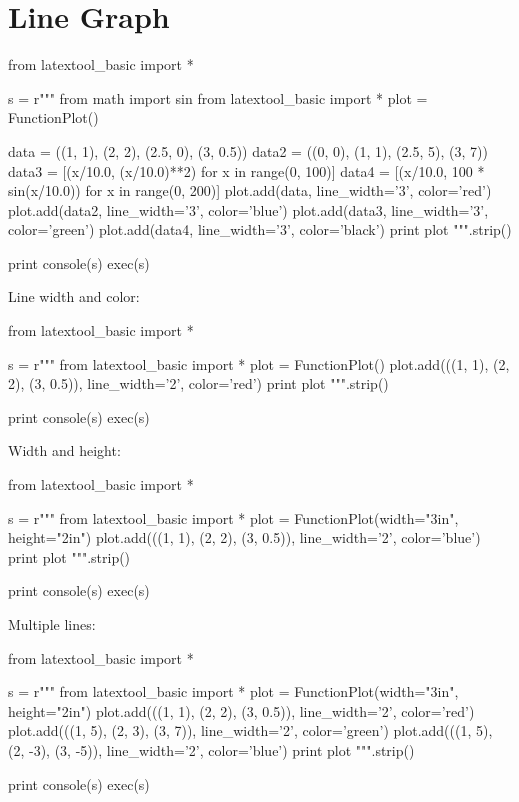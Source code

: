 \section{Line Graph}

\begin{python}
from latextool_basic import *

s = r"""
from math import sin
from latextool_basic import *
plot = FunctionPlot()

data = ((1, 1), (2, 2), (2.5, 0), (3, 0.5))
data2 = ((0, 0), (1, 1), (2.5, 5), (3, 7))
data3 = [(x/10.0, (x/10.0)**2) for x in range(0, 100)]
data4 = [(x/10.0, 100 * sin(x/10.0)) for x in range(0, 200)]
plot.add(data, line_width='3', color='red')
plot.add(data2, line_width='3', color='blue')
plot.add(data3, line_width='3', color='green')
plot.add(data4, line_width='3', color='black')
print plot
""".strip()

print console(s)
exec(s)
\end{python}





\newpage
Line width and color:
\begin{python}
from latextool_basic import *

s = r"""
from latextool_basic import *
plot = FunctionPlot()
plot.add(((1, 1), (2, 2), (3, 0.5)), line_width='2', color='red')
print plot
""".strip()

print console(s)
exec(s)
\end{python}



\newpage
Width and height:
\begin{python}
from latextool_basic import *

s = r"""
from latextool_basic import *
plot = FunctionPlot(width="3in", height="2in")
plot.add(((1, 1), (2, 2), (3, 0.5)), line_width='2', color='blue')
print plot
""".strip()

print console(s)
exec(s)
\end{python}



\newpage
Multiple lines:
\begin{python}
from latextool_basic import *

s = r"""
from latextool_basic import *
plot = FunctionPlot(width="3in", height="2in")
plot.add(((1, 1), (2, 2), (3, 0.5)), line_width='2', color='red')
plot.add(((1, 5), (2, 3), (3, 7)), line_width='2', color='green')
plot.add(((1, 5), (2, -3), (3, -5)), line_width='2', color='blue')
print plot
""".strip()

print console(s)
exec(s)
\end{python}



